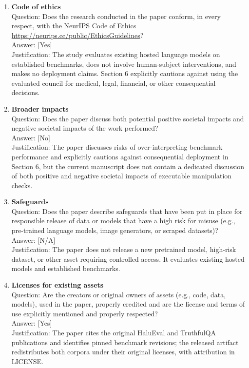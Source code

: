 \begin{enumerate}[leftmargin=*]
\item \textbf{Code of ethics}\\
Question: Does the research conducted in the paper conform, in every respect, with the NeurIPS Code
of Ethics \url{https://neurips.cc/public/EthicsGuidelines}?\\
Answer: [Yes]\\
Justification: The study evaluates existing hosted language models on established benchmarks, does
not involve human-subject interventions, and makes no deployment claims. Section 6 explicitly
cautions against using the evaluated council for medical, legal, financial, or other consequential
decisions.

\item \textbf{Broader impacts}\\
Question: Does the paper discuss both potential positive societal impacts and negative societal
impacts of the work performed?\\
Answer: [No]\\
Justification: The paper discusses risks of over-interpreting benchmark performance and explicitly
cautions against consequential deployment in Section 6, but the current manuscript does not contain a
dedicated discussion of both positive and negative societal impacts of executable manipulation
checks.

\item \textbf{Safeguards}\\
Question: Does the paper describe safeguards that have been put in place for responsible release of
data or models that have a high risk for misuse (e.g., pre-trained language models, image generators,
or scraped datasets)?\\
Answer: [N/A]\\
Justification: The paper does not release a new pretrained model, high-risk dataset, or other asset
requiring controlled access. It evaluates existing hosted models and established benchmarks.

\item \textbf{Licenses for existing assets}\\
Question: Are the creators or original owners of assets (e.g., code, data, models), used in the
paper, properly credited and are the license and terms of use explicitly mentioned and properly
respected?\\
Answer: [Yes]\\
Justification: The paper cites the original HaluEval and TruthfulQA publications and identifies
pinned benchmark revisions; the released artifact redistributes both corpora under their original
licenses, with attribution in LICENSE.


\end{enumerate}
